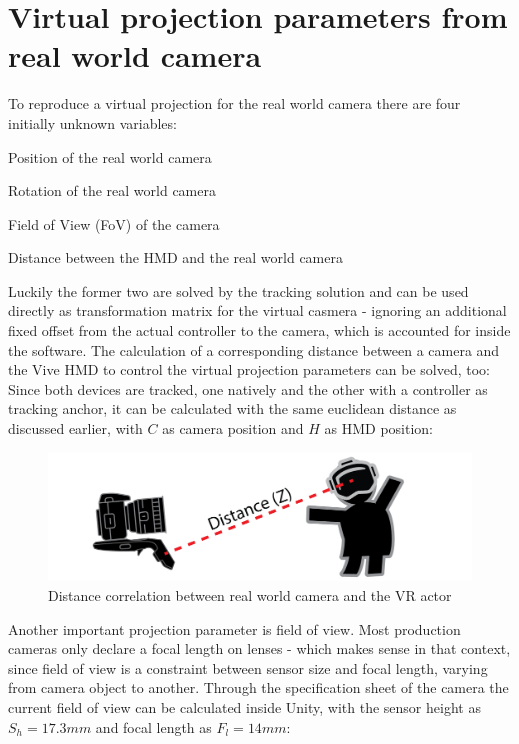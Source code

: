 %
\section{Virtual projection parameters from real world camera}
\label{sec:projection-params}
To reproduce a virtual projection for the real world camera there are four 
initially unknown variables:

\begin{my_list}
	\item Position of the real world camera
	\item Rotation of the real world camera
	\item Field of View (FoV) of the camera
	\item Distance between the HMD and the real world camera
\end{my_list}

Luckily the former two are solved by the tracking solution and can be used 
directly as transformation matrix for the virtual casmera - ignoring an 
additional fixed offset from the actual controller to the camera, which is 
accounted for inside the software.
\newline
The calculation of a corresponding distance between a camera and the Vive HMD 
to control the virtual projection parameters can be solved, too: Since both 
devices are tracked, one natively and the other with a controller as 
tracking anchor, it can be calculated with the same euclidean distance as 
discussed earlier, with $C$ as camera position and $H$ as HMD position:


\begin{figure}[htb]
	\includegraphics[width=\textwidth]{gfx/distance-z.png}
	\caption{Distance correlation between real world camera and the VR actor}
	\label{fig:projection:distance}
\end{figure}

Another important projection parameter is field of view. Most production 
cameras only declare a focal length on lenses - which makes sense in that 
context, since field of view is a constraint between sensor size and focal 
length, varying from camera object to another. Through the specification sheet 
of the camera the current field of view can be calculated inside Unity, with 
the sensor height as $S_h = 17.3mm$ and focal length as $F_l = 14mm$:

